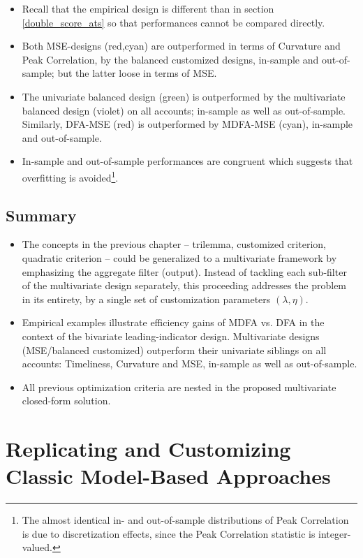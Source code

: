 \documentclass[a4paper]{book}
\begin{document}
\begin{itemize}
\item Recall that the empirical design is different than in section \ref{double_score_ats} so that performances cannot be compared directly. 
\item Both MSE-designs (red,cyan) are outperformed in terms of Curvature and Peak Correlation, by the balanced customized designs, in-sample and out-of-sample; but the latter loose in terms of MSE. 
\item The univariate balanced design (green) is outperformed by the multivariate balanced design (violet) on all accounts; in-sample as well as out-of-sample. Similarly, DFA-MSE (red) is outperformed by MDFA-MSE (cyan), in-sample and out-of-sample.
\item In-sample and out-of-sample performances are congruent which suggests that overfitting is avoided\footnote{The almost identical in- and out-of-sample distributions of Peak Correlation is due to discretization effects, since the Peak Correlation statistic is integer-valued.}.  
\end{itemize}




\section{Summary}

\begin{itemize}
\item The concepts in the previous chapter -- trilemma, customized criterion, quadratic criterion -- could be generalized to a multivariate framework by emphasizing the aggregate filter (output). Instead of tackling each sub-filter of the multivariate design separately, this proceeding addresses the problem in its entirety, by a single set of customization parameters $(\lambda,\eta)$.  
\item Empirical examples illustrate efficiency gains of MDFA vs. DFA in the context of the bivariate leading-indicator design. Multivariate designs (MSE/balanced customized) outperform their univariate siblings on all accounts: Timeliness, Curvature and MSE, in-sample as well as out-of-sample.
\item All previous optimization criteria are nested in the proposed multivariate closed-form solution.
\end{itemize}



\chapter{Replicating and Customizing Classic Model-Based Approaches}\label{rep_sec}
\end{document}
